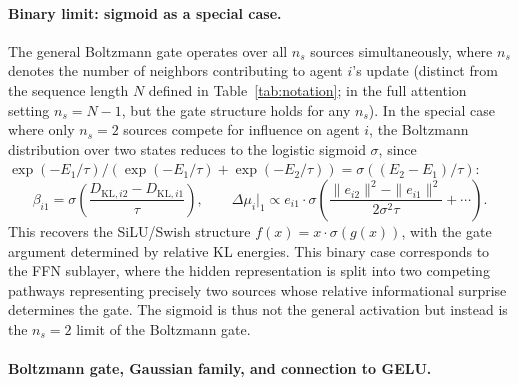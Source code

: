 \documentclass[twoside,11pt]{article}
\begin{document}
\paragraph{Binary limit: sigmoid as a special case.}

The general Boltzmann gate operates over all $n_s$ sources simultaneously, where $n_s$ denotes the number of neighbors contributing to agent $i$'s update (distinct from the sequence length $N$ defined in Table~\ref{tab:notation}; in the full attention setting $n_s = N-1$, but the gate structure holds for any $n_s$). In the special case where only $n_s = 2$ sources compete for influence on agent $i$, the Boltzmann distribution over two states reduces to the logistic sigmoid $\sigma$, since $\exp(-E_1/\tau)/(\exp(-E_1/\tau) + \exp(-E_2/\tau)) = \sigma((E_2 - E_1)/\tau)$:
%
\begin{equation}
\beta_{i1} = \sigma \left(\frac{D_{\mathrm{KL},i2} - D_{\mathrm{KL},i1}}{\tau}\right),
\qquad
\Delta\mu_i\big|_1 \propto e_{i1} \cdot \sigma \left(\frac{\|e_{i2}\|^2 - \|e_{i1}\|^2}{2\sigma^2\tau} + \cdots\right).
\label{eq:binary_silu}
\end{equation}
%
This recovers the SiLU/Swish \citep{ramachandran2018searching} structure $f(x) = x \cdot \sigma(g(x))$, with the gate argument determined by relative KL energies. This binary case corresponds to the FFN sublayer, where the hidden representation is split into two competing pathways representing precisely two sources whose relative informational surprise determines the gate. The sigmoid is thus not the general activation but instead is the $n_s = 2$ limit of the Boltzmann gate.

\paragraph{Boltzmann gate, Gaussian family, and connection to GELU.}
\end{document}
